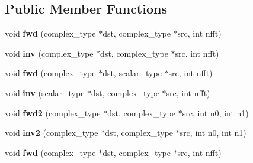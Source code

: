 \subsection*{Public Member Functions}
\begin{DoxyCompactItemize}
\item 
\mbox{\label{struct_eigen_1_1internal_1_1fftw__plan_3_01double_01_4_a48968e6abdf5c5e3fcdd5ba53117aafb}} 
void {\bfseries fwd} (complex\+\_\+type $\ast$dst, complex\+\_\+type $\ast$src, int nfft)
\item 
\mbox{\label{struct_eigen_1_1internal_1_1fftw__plan_3_01double_01_4_a8bcceee3ae70cf398d7e00a07109a2e2}} 
void {\bfseries inv} (complex\+\_\+type $\ast$dst, complex\+\_\+type $\ast$src, int nfft)
\item 
\mbox{\label{struct_eigen_1_1internal_1_1fftw__plan_3_01double_01_4_aa5f91d54fad64fbe4f5b7d8969c77542}} 
void {\bfseries fwd} (complex\+\_\+type $\ast$dst, scalar\+\_\+type $\ast$src, int nfft)
\item 
\mbox{\label{struct_eigen_1_1internal_1_1fftw__plan_3_01double_01_4_a2c8abc28e2847bf0fd03f28be2273d86}} 
void {\bfseries inv} (scalar\+\_\+type $\ast$dst, complex\+\_\+type $\ast$src, int nfft)
\item 
\mbox{\label{struct_eigen_1_1internal_1_1fftw__plan_3_01double_01_4_ace4c5f1b0687b0e85fdc1ce9e188aaa3}} 
void {\bfseries fwd2} (complex\+\_\+type $\ast$dst, complex\+\_\+type $\ast$src, int n0, int n1)
\item 
\mbox{\label{struct_eigen_1_1internal_1_1fftw__plan_3_01double_01_4_a90bfe92a1e64201b30f2a9f1a075044e}} 
void {\bfseries inv2} (complex\+\_\+type $\ast$dst, complex\+\_\+type $\ast$src, int n0, int n1)
\item 
\mbox{\label{struct_eigen_1_1internal_1_1fftw__plan_3_01double_01_4_a48968e6abdf5c5e3fcdd5ba53117aafb}} 
void {\bfseries fwd} (complex\+\_\+type $\ast$dst, complex\+\_\+type $\ast$src, int nfft)

\end{DoxyCompactItemize}
